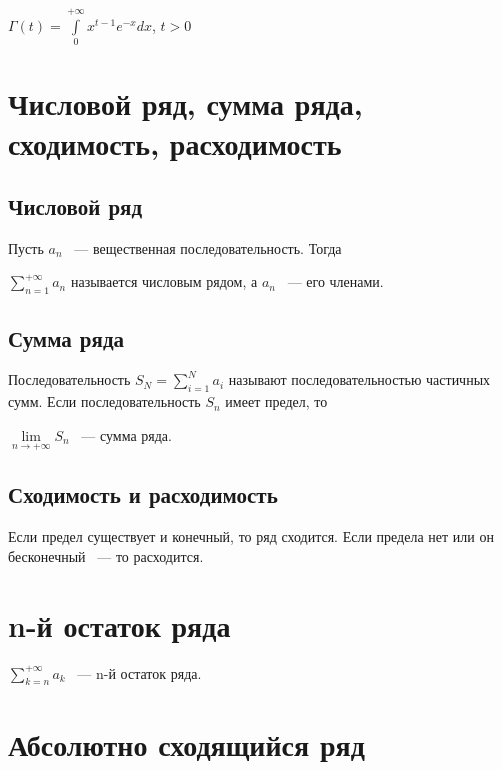 \documentclass{article}
\begin{document}
        $\Gamma(t) = \int\limits^{+\infty}_0 x^{t - 1} e^{-x} dx$, $t > 0$
        
    \newpage
    
    \section{Числовой ряд, сумма ряда, сходимость, расходимость}
    
        \subsection{Числовой ряд}
        
            Пусть $a_n$ ~--- вещественная последовательность. Тогда
            
            $\sum\limits_{n = 1}^{+\infty} a_n$ называется числовым рядом, а $a_n$ ~--- его членами. 
            
        \subsection{Сумма ряда}
        
            Последовательность $S_N = \sum\limits_{i = 1}^N a_i$ называют последовательностью частичных сумм. Если последовательность $S_n$ имеет предел, то 
            
            $\lim\limits_{n \rightarrow +\infty} S_n$ ~--- сумма ряда.
            
        \subsection{Сходимость и расходимость}
        
            Если предел существует и конечный, то ряд сходится. Если предела нет или он бесконечный ~--- то расходится.
            
    \newpage
    
    \section{n-й остаток ряда}
    
        $\sum\limits_{k = n}^{+\infty} a_k$ ~--- n-й остаток ряда.
        
    \newpage
    
    \section{Абсолютно сходящийся ряд}
    
\end{document}
